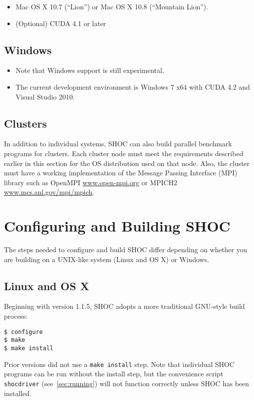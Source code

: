 \documentclass[11pt]{article}
\begin{document}
\begin{itemize}
\item Mac OS X 10.7 (``Lion'') or Mac OS X 10.8 (``Mountain Lion'').
\item (Optional) CUDA 4.1 or later
\end{itemize}

\subsection{Windows}

\begin{itemize}
\item Note that Windows support is still experimental.
\item The current development environment is Windows 7 x64 with CUDA 4.2 and Visual Studio 2010.
\end{itemize}


\subsection{Clusters}
In addition to individual systems, SHOC can also build parallel benchmark
programs for clusters. Each cluster node must meet the requirements described
earlier in this section for the OS distribution used on that node.
Also, the cluster must have a working implementation of the 
Message Passing Interface 
(MPI)\,\cite{gropp-lusk-skjellum:using-mpi2nd,gropp-lusk-thakur:usingmpi2}
library such as OpenMPI \url{www.open-mpi.org} or MPICH2 
\url{www.mcs.anl.gov/mpi/mpich}.


\section{Configuring and Building SHOC}\label{sec:configuring}

The steps needed to configure and build SHOC differ depending on whether
you are building on a UNIX-like system (Linux and OS X) or Windows.

\subsection{Linux and OS X}\label{sec:conflinux}

Beginning with version 1.1.5, SHOC adopts a more traditional GNU-style
build process:
\begin{Verbatim}[frame=single]
$ configure
$ make
$ make install
\end{Verbatim}
\noindent Prior versions did not use a \verb+make install+ step.
Note that individual SHOC programs can be run without the install step,
but the convenience script \verb+shocdriver+ (see~\ref{sec:running}) will 
not function correctly unless SHOC has been installed.
\end{document}
